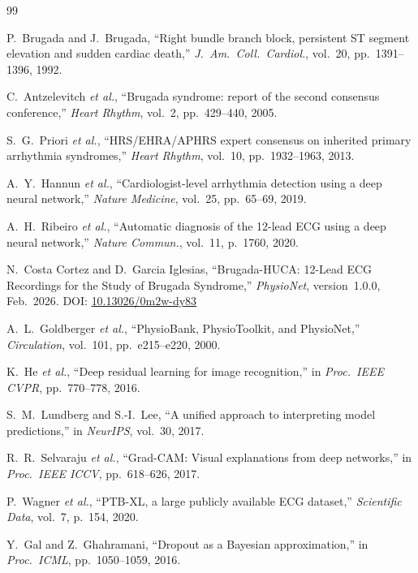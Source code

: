 \documentclass[journal, 10pt, twoside]{IEEEtran}
\begin{document}
\begin{thebibliography}{99}

P.~Brugada and J.~Brugada,
``Right bundle branch block, persistent ST segment elevation and sudden
  cardiac death,''
\textit{J.\ Am.\ Coll.\ Cardiol.}, vol.~20, pp.~1391--1396, 1992.

C.~Antzelevitch \textit{et al.},
``Brugada syndrome: report of the second consensus conference,''
\textit{Heart Rhythm}, vol.~2, pp.~429--440, 2005.

S.~G.~Priori \textit{et al.},
``HRS/EHRA/APHRS expert consensus on inherited primary arrhythmia
  syndromes,''
\textit{Heart Rhythm}, vol.~10, pp.~1932--1963, 2013.

A.~Y.~Hannun \textit{et al.},
``Cardiologist-level arrhythmia detection using a deep neural network,''
\textit{Nature Medicine}, vol.~25, pp.~65--69, 2019.

A.~H.~Ribeiro \textit{et al.},
``Automatic diagnosis of the 12-lead ECG using a deep neural network,''
\textit{Nature Commun.}, vol.~11, p.~1760, 2020.

N.~{Costa Cortez} and D.~{Garcia Iglesias},
``Brugada-HUCA: 12-Lead ECG Recordings for the Study of Brugada Syndrome,''
\textit{PhysioNet}, version~1.0.0, Feb.\ 2026.
DOI: \href{https://doi.org/10.13026/0m2w-dy83}{10.13026/0m2w-dy83}

A.~L.~Goldberger \textit{et al.},
``PhysioBank, PhysioToolkit, and PhysioNet,''
\textit{Circulation}, vol.~101, pp.~e215--e220, 2000.

K.~He \textit{et al.},
``Deep residual learning for image recognition,''
in \textit{Proc.\ IEEE CVPR}, pp.~770--778, 2016.

S.~M.~Lundberg and S.-I.~Lee,
``A unified approach to interpreting model predictions,''
in \textit{NeurIPS}, vol.~30, 2017.

R.~R.~Selvaraju \textit{et al.},
``Grad-CAM: Visual explanations from deep networks,''
in \textit{Proc.\ IEEE ICCV}, pp.~618--626, 2017.

P.~Wagner \textit{et al.},
``PTB-XL, a large publicly available ECG dataset,''
\textit{Scientific Data}, vol.~7, p.~154, 2020.

Y.~Gal and Z.~Ghahramani,
``Dropout as a Bayesian approximation,''
in \textit{Proc.\ ICML}, pp.~1050--1059, 2016.

\end{thebibliography}

\balance
\end{document}

